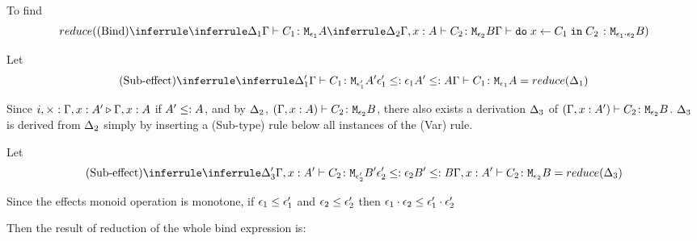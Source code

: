{            To find
            \begin{equation}
                \reduce(
                    \ntreeruleI{Bind}{
                        \treeruleI{
                            \D_1
                        }{
                            \gtyperelation{C_1}{\M{\e_1}{A}}
                        }
                        }{
                        \treeruleI{
                            \D_2
                        }{
                            \typerelation{\gax}{C_2}{\M{\e_2}{B}}
                        }
                    } {
                        \gtyperelation{\doin{x}{C_1}{C_2}}{\M{\e_1\dot\e_2}{B}}
                    }
                )
            \end{equation}


            Let \begin{equation}
                \ntreeruleI{Sub-effect}{
                    \treeruleI{\D'_1}{\gtyperelation{C_1}{\M{\e'_1}{A'}}}
                }{
                \e_1' \subtype \e_1
                }{
                A' \subtype A
                }{
                    \gtyperelation{C_1}{\M{\e_1}{A}}
                } = \reduce(\D_1)
            \end{equation}

            Since $i,\times : \Gamma, x: A' \triangleright \Gamma, x: A$ if $A' \leq: A$, and by $\Delta_2$, $(\Gamma, x: A) \vdash C_2 \colon \texttt{M}_{\epsilon_2}{B}$, there also exists a derivation $\Delta_3$ of $(\Gamma, x: A') \vdash C_2 \colon \texttt{M}_{\epsilon_2}{B}$. $\Delta_3$ is derived from $\Delta_2$ simply by inserting a (Sub-type) rule below all instances of the (Var) rule.

            Let \begin{equation}
                \ntreeruleI{Sub-effect}{
                    \treeruleI{\D'_3}{\typerelation{\G, x: A'}{C_2}{\M{\e'_2}{B'}}}
                }{
                \e_2' \subtype \e_2
                }{
                B' \subtype B
                }{
                    \typerelation{\G, x: A'}{C_2}{\M{\e_2}{B}}
                } = \reduce(\D_3)
            \end{equation}
            

            Since the effects monoid operation is monotone, if $\epsilon_1\leq\epsilon_1'$ and $\epsilon_2\leq\epsilon_2'$ then $\epsilon_1\cdot\epsilon_2 \leq \epsilon_1'\cdot\epsilon_2'$
            


            Then the result of reduction of the whole bind expression is:


}
